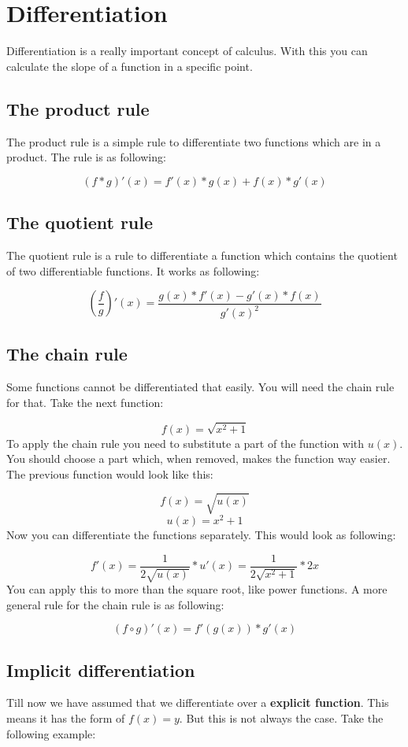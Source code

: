 \section{Differentiation}

Differentiation is a really important concept of calculus.
With this you can calculate the slope of a function in a specific point.

\subsection{The product rule}
The product rule is a simple rule to differentiate two functions which are in a product.
The rule is as following:

\[(f * g)'(x)=f'(x) * g(x) + f(x) * g'(x)\]

\subsection{The quotient rule}
The quotient rule is a rule to differentiate a function which contains the quotient of two differentiable functions.
It works as following:

\[
  (\frac{f}{g})'(x) =
  \frac{g(x) * f'(x) - g'(x) * f(x)}{{g'(x)}^2}
\]

\subsection{The chain rule}
Some functions cannot be differentiated that easily.
You will need the chain rule for that.
Take the next function:

\[f(x) = \sqrt{x^2+1}\]
To apply the chain rule you need to substitute a part of the function with \(u(x)\).
You should choose a part which, when removed, makes the function way easier.
The previous function would look like this:

\[f(x) = \sqrt{u(x)}\]
\[u(x) = x^2+1\]
Now you can differentiate the functions separately.
This would look as following:

\[
  f'(x) =
  \frac{1}{2\sqrt{u(x)}} * u'(x) =
  \frac{1}{2\sqrt{x^2+1}} * 2x
\]
You can apply this to more than the square root, like power functions.
A more general rule for the chain rule is as following:

\[(f \circ g)'(x)=f'(g(x)) * g'(x)\]

\subsection{Implicit differentiation}
Till now we have assumed that we differentiate over a {\bf explicit function}.
This means it has the form of \(f(x) = y\).
But this is not always the case.
Take the following example:

